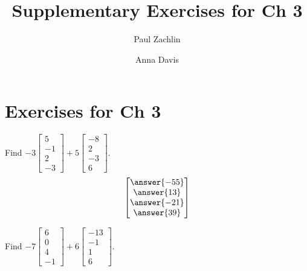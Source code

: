 \documentclass{ximera}
\author{Paul Zachlin \and Anna Davis} \title{Supplementary Exercises for Ch 3} \license{CC-BY 4.0}
\begin{document}
\begin{abstract}
\end{abstract}
\maketitle

\section*{Exercises for Ch 3}

\begin{problem}\label{prb:3.1} Find $-3
\begin{bmatrix}
5 \\
-1 \\
2 \\
-3
\end{bmatrix}
 +5
\begin{bmatrix}
-8 \\
2 \\
-3 \\
6
\end{bmatrix}.$
$$\begin{bmatrix}
\answer{-55} \\
\answer{13} \\
\answer{-21} \\
\answer{39}
\end{bmatrix}$$
\end{problem}

\begin{problem}\label{prb:3.2} Find $-7
\begin{bmatrix}
6 \\
0 \\
4 \\
-1
\end{bmatrix} +6
\begin{bmatrix}
-13 \\
-1 \\
1 \\
6
\end{bmatrix}.$
\end{problem}
\end{document}
